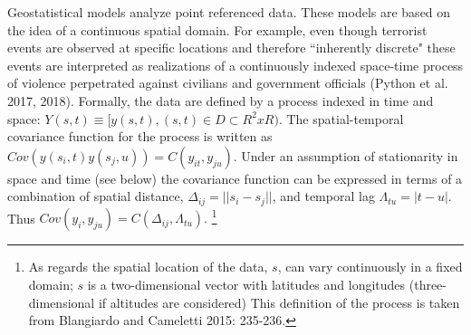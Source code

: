 \documentclass[12pt]{article}
\begin{document}
Geostatistical models analyze point referenced data. These models are based on the idea of a
continuous spatial domain. For example, even though terrorist events are observed at specific
locations and therefore ``inherently discrete" these events are interpreted as realizations of
 a continuously indexed space-time process of violence perpetrated against civilians and
 government officials (Python et al. 2017, 2018). Formally, the data are defined by a
 process indexed in time and space:
$Y(s,t) \equiv [y(s,t), (s,t) \in D \subset R^2 x R)$. The spatial-temporal covariance function
for the process is written as $Cov(y(s_i,t)y(s_j,u)) = C(y_{it},y_{ju})$. Under an assumption
of stationarity in space and time (see below) the covariance function can be expressed in terms of a combination
of spatial distance, $\Delta_{ij} = ||s_i - s_j||$, and temporal lag $\Lambda_{tu} = |t-u|$.
Thus $Cov(y_{i},y_{ju}) =
 C(\Delta_{ij}, \Lambda_{tu}).$ \footnote{As regards the spatial location of the data,
 $s$, can vary continuously in a fixed domain;
 $s$ is a two-dimensional vector with latitudes and longitudes (three-dimensional if
 altitudes are considered) This definition of the process is taken from Blangiardo
 and Cameletti 2015: 235-236.}
\end{document}
